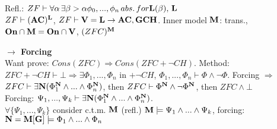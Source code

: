 \documentclass[9pt]{article}
\newcommand{\class}[1]{{\bf #1}}
\newcommand{\mytitle}[1]{ {\bf $\rightarrow$ #1}\\}
\newcommand{\V}{\class{V}}
\begin{document}
\begin{multicols*}{2}
Refl.: $ZF\vdash \forall\alpha\,\exists\beta>\alpha \phi_0,...,\phi_n\,abs.\,for \class{L}(\beta),\,\class{L}$\\
$ZF\vdash (\class{AC})^{\class{L}}$, $ZF\vdash \V=\class{L}\to \class{AC}, \class{GCH}$.
Inner model $\class{M}$: trans., $\class{On}\cap\class{M}=\class{On}\cap\V$, $(ZFC)^\class{M}$

\mytitle{Forcing}
Want prove: $Cons(ZFC)\Rightarrow Cons(ZFC+\neg CH)$.
Method: $ZFC+\neg CH\vdash\bot\Rightarrow\exists \Phi_1,...,\Phi_n$ in $+\neg CH$, $\Phi_1,...,\Phi_n\vdash \Phi \wedge\neg\Phi$.
Forcing $\Rightarrow$ $ZFC\vdash\exists\class{N}(\Phi_1^\class{N}\wedge...\wedge\Phi_n^\class{N})$, then $ZFC\vdash \Phi^\class{N}\wedge\neg\Phi^\class{N}$, then $ZFC\wedge\bot$\\
Forcing: $\Psi_1,...,\Psi_k\vdash \exists\class{N}(\Phi_1^\class{N}\wedge...\wedge\Phi_n^\class{N})$.\\
$\forall \{\Psi_1,...,\Psi_k\}$ consider c.t.m. $\class{M}$ (refl.) $\class{M}\models \Psi_1\wedge...\wedge\Psi_k$, forcing: $\class{N}=\class{M}[\class{G}]\models\Phi_1\wedge...\wedge\Phi_n$\\


\end{multicols*}
\end{document}
